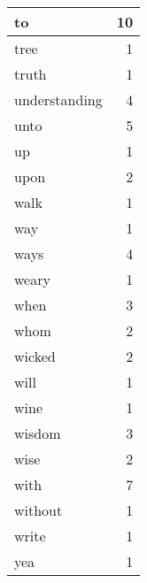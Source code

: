 \begin{center}
\begin{longtable}{l|r}
to & 10\\ \hline 
tree & 1\\ \hline 
truth & 1\\ \hline 
understanding & 4\\ \hline 
unto & 5\\ \hline 
up & 1\\ \hline 
upon & 2\\ \hline 
walk & 1\\ \hline 
way & 1\\ \hline 
ways & 4\\ \hline 
weary & 1\\ \hline 
when & 3\\ \hline 
whom & 2\\ \hline 
wicked & 2\\ \hline 
will & 1\\ \hline 
wine & 1\\ \hline 
wisdom & 3\\ \hline 
wise & 2\\ \hline 
with & 7\\ \hline 
without & 1\\ \hline 
write & 1\\ \hline 
yea & 1\\ \hline 
\end{longtable}  
\end{center}  


  
\normalsize  

  
  
